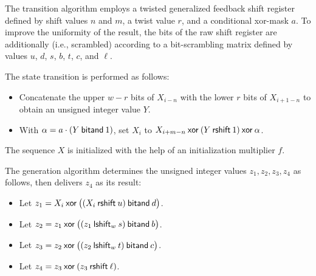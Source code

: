 \pnum
The transition algorithm%
%
employs a twisted generalized feedback shift register
defined by shift values $n$ and $m$, a twist value $r$,
and a conditional xor-mask $a$.
To improve the uniformity of the result,
the bits of the raw shift register are additionally 
(i.e., scrambled) according to a bit-scrambling matrix
defined by values $u$, $d$, $s$, $b$, $t$, $c$, and $\ell$.

The state transition is performed as follows:
\begin{itemize}
 \item
   Concatenate
     the upper $w-r$ bits of $X_{i-n}$
   with
     the lower $r$ bits of $X_{i+1-n}$
   to obtain an unsigned integer value $Y$.
 \item
   With $\alpha = a \cdot (Y \mathbin{\mathsf{bitand}} 1)$,
   set $X_i$ to
     $X_{i+m-n} \mathbin{\mathsf{xor}} (Y \mathbin{\mathsf{rshift}} 1) \mathbin{\mathsf{xor}} \alpha$.
\end{itemize}
The sequence $X$ is initialized
with the help of an initialization multiplier $f$.

\pnum
The generation algorithm%
%
 determines the unsigned integer values $z_1, z_2, z_3, z_4$ as follows,
 then delivers $z_4$ as its result:
\begin{itemize}
 \item
   Let $z_1 = X_i \mathbin{\mathsf{xor}} \bigl(( X_i \mathbin{\mathsf{rshift}} u ) \mathbin{\mathsf{bitand}} d\bigr)$.
 \item
   Let $z_2 = z_1 \mathbin{\mathsf{xor}} \bigl( (z_1 \mathbin{\mathsf{lshift}_{w}} s) \mathbin{\mathsf{bitand}} b \bigr)$.
 \item
   Let $z_3 = z_2 \mathbin{\mathsf{xor}} \bigl( (z_2 \mathbin{\mathsf{lshift}_{w}} t) \mathbin{\mathsf{bitand}} c \bigr)$.
 \item
   Let $z_4 = z_3 \mathbin{\mathsf{xor}} ( z_3 \mathbin{\mathsf{rshift}} \ell )$.
\end{itemize}

